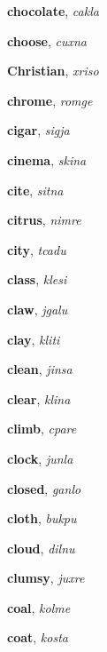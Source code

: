 \documentclass[12pt]{book}
\begin{document}
\begin{description}
\item[ ] \textbf{chocolate}, \textit{cakla}

\item[ ] \textbf{choose}, \textit{cuxna}

\item[ ] \textbf{Christian}, \textit{xriso}

\item[ ] \textbf{chrome}, \textit{romge}

\item[ ] \textbf{cigar}, \textit{sigja}

\item[ ] \textbf{cinema}, \textit{skina}

\item[ ] \textbf{cite}, \textit{sitna}

\item[ ] \textbf{citrus}, \textit{nimre}

\item[ ] \textbf{city}, \textit{tcadu}

\item[ ] \textbf{class}, \textit{klesi}

\item[ ] \textbf{claw}, \textit{jgalu}

\item[ ] \textbf{clay}, \textit{kliti}

\item[ ] \textbf{clean}, \textit{jinsa}

\item[ ] \textbf{clear}, \textit{klina}

\item[ ] \textbf{climb}, \textit{cpare}

\item[ ] \textbf{clock}, \textit{junla}

\item[ ] \textbf{closed}, \textit{ganlo}

\item[ ] \textbf{cloth}, \textit{bukpu}

\item[ ] \textbf{cloud}, \textit{dilnu}

\item[ ] \textbf{clumsy}, \textit{juxre}

\item[ ] \textbf{coal}, \textit{kolme}

\item[ ] \textbf{coat}, \textit{kosta}


\end{description}
\end{document}
